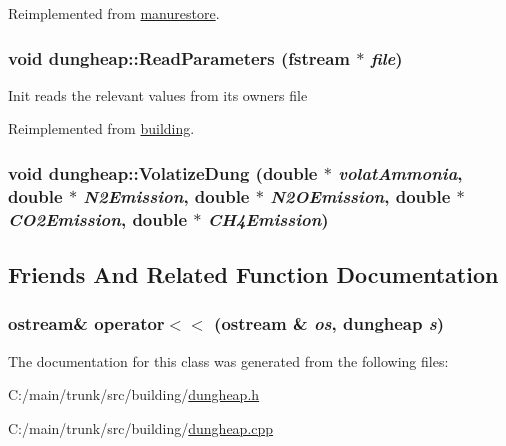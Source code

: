 Reimplemented from \hyperlink{classmanurestore_ab32685c2f4be9bb58269655cab7c96ee}{manurestore}.\hypertarget{classdungheap_a369749ce14a7061f1c1f4e0c6973d68f}{
\subsubsection[{ReadParameters}]{\setlength{\rightskip}{0pt plus 5cm}void dungheap::ReadParameters (fstream $\ast$ {\em file})}}
\label{classdungheap_a369749ce14a7061f1c1f4e0c6973d68f}
Init reads the relevant values from its owners file 

Reimplemented from \hyperlink{classbuilding_a5649b5598b63c3a4cf7a4e6e7d452d5d}{building}.\hypertarget{classdungheap_ac5ed38db9dc9fd3be29ebec8d5034402}{
\subsubsection[{VolatizeDung}]{\setlength{\rightskip}{0pt plus 5cm}void dungheap::VolatizeDung (double $\ast$ {\em volatAmmonia}, \/  double $\ast$ {\em N2Emission}, \/  double $\ast$ {\em N2OEmission}, \/  double $\ast$ {\em CO2Emission}, \/  double $\ast$ {\em CH4Emission})}}
\label{classdungheap_ac5ed38db9dc9fd3be29ebec8d5034402}


\subsection{Friends And Related Function Documentation}
\hypertarget{classdungheap_a90fa119f05925fe4eaa6d738c3db6f65}{
\subsubsection[{operator$<$$<$}]{\setlength{\rightskip}{0pt plus 5cm}ostream\& operator$<$$<$ (ostream \& {\em os}, \/  {\bf dungheap} {\em s})}}
\label{classdungheap_a90fa119f05925fe4eaa6d738c3db6f65}


The documentation for this class was generated from the following files:\begin{DoxyCompactItemize}
\item 
C:/main/trunk/src/building/\hyperlink{dungheap_8h}{dungheap.h}\item 
C:/main/trunk/src/building/\hyperlink{dungheap_8cpp}{dungheap.cpp}\end{DoxyCompactItemize}
